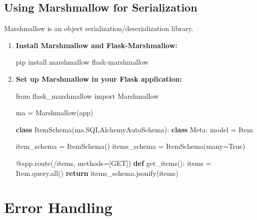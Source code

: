 \documentclass[
  letterpaper,
  DIV=11,
  numbers=noendperiod]{scrreprt}
\newenvironment{Shaded}{\begin{snugshade}}{\end{snugshade}}
\newcommand{\AttributeTok}[1]{\textcolor[rgb]{0.40,0.45,0.13}{#1}}
\newcommand{\BuiltInTok}[1]{\textcolor[rgb]{0.00,0.23,0.31}{#1}}
\newcommand{\ControlFlowTok}[1]{\textcolor[rgb]{0.00,0.23,0.31}{\textbf{#1}}}
\newcommand{\ExtensionTok}[1]{\textcolor[rgb]{0.00,0.23,0.31}{#1}}
\newcommand{\ImportTok}[1]{\textcolor[rgb]{0.00,0.46,0.62}{#1}}
\newcommand{\KeywordTok}[1]{\textcolor[rgb]{0.00,0.23,0.31}{\textbf{#1}}}
\newcommand{\NormalTok}[1]{\textcolor[rgb]{0.00,0.23,0.31}{#1}}
\newcommand{\OperatorTok}[1]{\textcolor[rgb]{0.37,0.37,0.37}{#1}}
\newcommand{\StringTok}[1]{\textcolor[rgb]{0.13,0.47,0.30}{#1}}
\newcommand{\VariableTok}[1]{\textcolor[rgb]{0.07,0.07,0.07}{#1}}
\begin{document}
\subsection{Using Marshmallow for
Serialization}\label{using-marshmallow-for-serialization}

Marshmallow is an object serialization/deserialization library.

\begin{enumerate}
\def\labelenumi{\arabic{enumi}.}
\item
  \textbf{Install Marshmallow and Flask-Marshmallow:}

\begin{Shaded}
\begin{Highlighting}[]
\ExtensionTok{pip}\NormalTok{ install marshmallow flask{-}marshmallow}
\end{Highlighting}
\end{Shaded}
\item
  \textbf{Set up Marshmallow in your Flask application:}

\begin{Shaded}
\begin{Highlighting}[]
\ImportTok{from}\NormalTok{ flask\_marshmallow }\ImportTok{import}\NormalTok{ Marshmallow}

\NormalTok{ma }\OperatorTok{=}\NormalTok{ Marshmallow(app)}

\KeywordTok{class}\NormalTok{ ItemSchema(ma.SQLAlchemyAutoSchema):}
    \KeywordTok{class}\NormalTok{ Meta:}
\NormalTok{        model }\OperatorTok{=}\NormalTok{ Item}

\NormalTok{item\_schema }\OperatorTok{=}\NormalTok{ ItemSchema()}
\NormalTok{items\_schema }\OperatorTok{=}\NormalTok{ ItemSchema(many}\OperatorTok{=}\VariableTok{True}\NormalTok{)}

\AttributeTok{@app.route}\NormalTok{(}\StringTok{\textquotesingle{}/items\textquotesingle{}}\NormalTok{, methods}\OperatorTok{=}\NormalTok{[}\StringTok{\textquotesingle{}GET\textquotesingle{}}\NormalTok{])}
\KeywordTok{def}\NormalTok{ get\_items():}
\NormalTok{    items }\OperatorTok{=}\NormalTok{ Item.query.}\BuiltInTok{all}\NormalTok{()}
    \ControlFlowTok{return}\NormalTok{ items\_schema.jsonify(items)}
\end{Highlighting}
\end{Shaded}
\end{enumerate}

\section{Error Handling}\label{error-handling-5}
\end{document}
